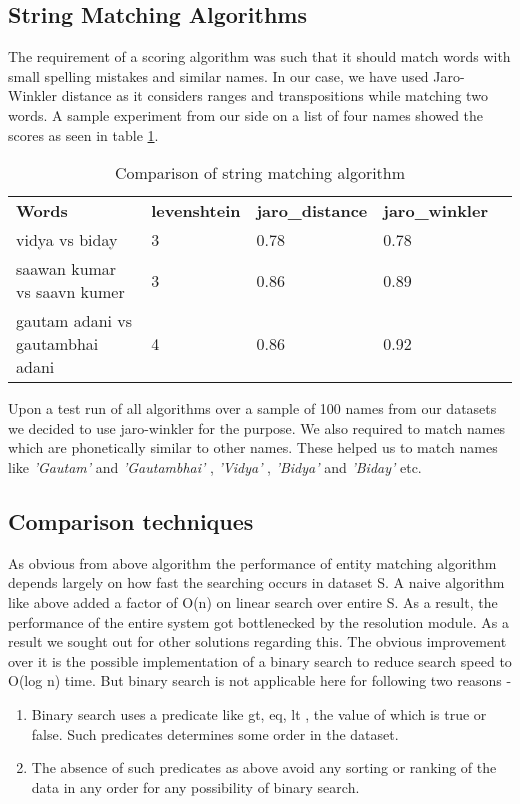 \subsection{String Matching Algorithms}
        The requirement of a scoring algorithm was such that it should match words with small spelling mistakes and similar names. In our case, we have used Jaro-Winkler distance as it considers ranges and transpositions while matching two words. A sample experiment from our side on a list of four names showed the scores as seen in table \ref{table:1}.
    \begin{table}[H]
    \centering
    \caption{Comparison of string matching algorithm}
    \label{table:1}
    \begin{tabular}{|l|l|l|l|l}
    \cline{1-4}
    \textbf{Words}                   & \textbf{levenshtein} & \textbf{jaro\_distance} & \textbf{jaro\_winkler} &  \\ \cline{1-4}
    vidya vs biday                   & 3                    & 0.78                    & 0.78                   &  \\ \cline{1-4}
    saawan kumar vs saavn kumer      & 3                    & 0.86                    & 0.89                   &  \\ \cline{1-4}
    gautam adani vs gautambhai adani & 4                    & 0.86                    & 0.92                   &  \\ \cline{1-4}
    \end{tabular}
    \end{table}
        Upon a test run of all algorithms over a sample of 100 names from our datasets we decided to use jaro-winkler for the purpose. We also required to match names which are phonetically similar to other names. These helped us to match names like \textit{ 'Gautam' } and \textit{ 'Gautambhai' }, \textit{ 'Vidya' }, \textit{ 'Bidya' } and \textit{ 'Biday' } etc.

\subsection{Comparison techniques}
        As obvious from above algorithm the performance of entity matching algorithm depends largely on how fast the searching occurs in dataset S. A naive algorithm like above added a factor of O(n) on linear search over entire S. As a result, the performance of the entire system got bottlenecked by the resolution module. As a result we sought out for other solutions regarding this. The obvious improvement over it is the possible implementation of a binary search to reduce search speed to O(log n) time. But binary search is not applicable here for following two reasons -
            \begin{enumerate}
                \item Binary search uses a predicate like gt, eq, lt , the value of which is true or false. Such predicates determines some order in the dataset. 
                \item The absence of such predicates as above avoid any sorting or ranking of the data in any order for any possibility of binary search.
        
            \end{enumerate}


